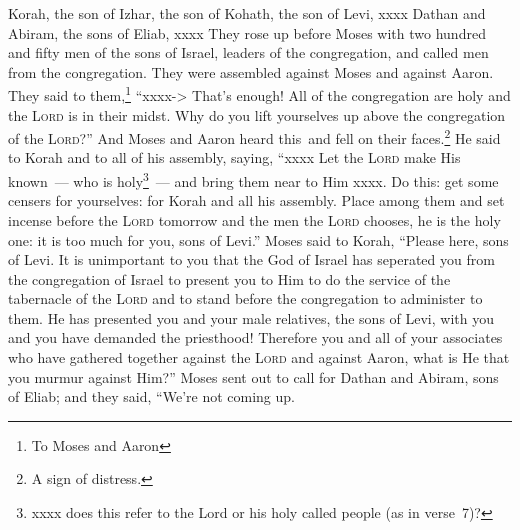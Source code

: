 
\begin{inparaenum}
     Korah, the son of Izhar, the son of Kohath, the son of Levi, xxxx Dathan and Abiram, the sons of Eliab, xxxx%
     They rose up before Moses with two hundred and fifty men of the sons of Israel, leaders of the congregation, and called men from the congregation.%
     They were assembled against Moses and against Aaron. They said to them,\footnote{To Moses and Aaron} ``xxxx-> That's enough! All of the congregation are holy and the \textsc{Lord} is in their midst. Why do you lift yourselves up above the congregation of the \textsc{Lord}?''%
     And Moses and Aaron heard this\understood\ and fell on their faces.\footnote{A sign of distress.}%
     He said to Korah and to all of his assembly, saying, ``xxxx Let the \textsc{Lord} make His known~--- who is holy\footnote{xxxx does this refer to the Lord or his holy called people (as in verse~7)?}~--- and bring them near to Him xxxx.%
     Do this: get some censers for yourselves: for Korah and all his assembly.%
     Place among them and set incense before the \textsc{Lord} tomorrow and the men the \textsc{Lord} chooses, he is the holy one: it is too much for you, sons of Levi.''%
     Moses said to Korah, ``Please here, sons of Levi.%
     It is unimportant to you that the God of Israel has seperated you from the congregation of Israel to present you to Him to do the service of the tabernacle of the \textsc{Lord} and to stand before the congregation to administer to them.%
     He has presented you and your male relatives, the sons of Levi, with you and you have demanded the priesthood!%
     Therefore you and all of your associates who have gathered together against the \textsc{Lord} and against Aaron, what is He that you murmur against Him?''%
     Moses sent out to call for Dathan and Abiram, sons of Eliab; and they said, ``We're not coming up.%

\end{inparaenum}
